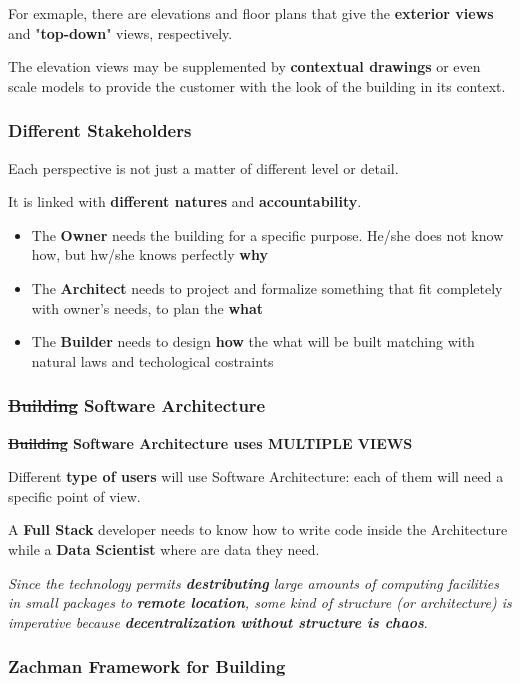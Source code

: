 For exmaple, there are elevations and floor plans that give the \textbf{exterior views} and "\textbf{top-down}" views, respectively.

The elevation views may be supplemented by \textbf{contextual drawings} or even scale models to provide the customer with the look of the building in its context.

\subsubsection{Different Stakeholders}
Each perspective is not just a matter of different level or detail.

It is linked with \textbf{different natures} and \textbf{accountability}.

\begin{itemize}
	\item The \textbf{Owner} needs the building for a specific purpose. He/she does not know how, but hw/she knows perfectly \textbf{why}
	\item The \textbf{Architect} needs to project and formalize something that fit completely with owner's needs, to plan the \textbf{what}
	\item The \textbf{Builder} needs to design \textbf{how} the what will be built matching with natural laws and techological costraints
\end{itemize}

\subsubsection{\sout{Building} Software Architecture}

\textbf{\sout{Building} Software Architecture uses MULTIPLE VIEWS}

Different \textbf{type of users} will use Software Architecture: each of them will need a specific point of view.

A \textbf{Full Stack} developer needs to know how to write code inside the Architecture while a \textbf{Data Scientist} where are data they need.

\begin{center}
	\textit{Since the technology permits \textbf{destributing} large amounts of computing facilities in small packages to \textbf{remote location}, some kind of structure (or architecture) is imperative because \textbf{decentralization without structure is chaos}}.
\end{center}

\subsubsection{Zachman Framework for Building}

